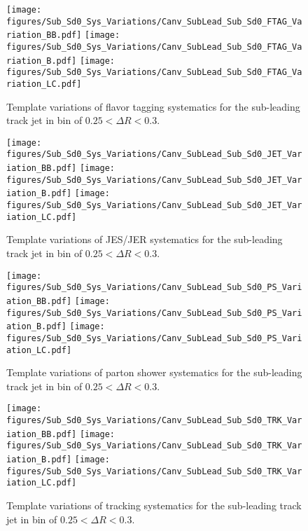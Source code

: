 \begin{figure}[htbp]
  \centering
 \texttt{[image: figures/Sub\_Sd0\_Sys\_Variations/Canv\_SubLead\_Sub\_Sd0\_FTAG\_Variation\_BB.pdf]}
 \texttt{[image: figures/Sub\_Sd0\_Sys\_Variations/Canv\_SubLead\_Sub\_Sd0\_FTAG\_Variation\_B.pdf]}
 \texttt{[image: figures/Sub\_Sd0\_Sys\_Variations/Canv\_SubLead\_Sub\_Sd0\_FTAG\_Variation\_LC.pdf]}
\caption{Template \subsdzero variations of flavor tagging systematics for the sub-leading track jet in bin of $0.25<\Delta R<0.3$. }
  \label{fig:sys-sublead-ftag}
\end{figure}

\begin{figure}[htbp]
  \centering
 \texttt{[image: figures/Sub\_Sd0\_Sys\_Variations/Canv\_SubLead\_Sub\_Sd0\_JET\_Variation\_BB.pdf]}
 \texttt{[image: figures/Sub\_Sd0\_Sys\_Variations/Canv\_SubLead\_Sub\_Sd0\_JET\_Variation\_B.pdf]}
 \texttt{[image: figures/Sub\_Sd0\_Sys\_Variations/Canv\_SubLead\_Sub\_Sd0\_JET\_Variation\_LC.pdf]}
\caption{Template \subsdzero variations of JES/JER systematics for the sub-leading track jet in bin of $0.25<\Delta R<0.3$. }
  \label{fig:sys-sublead-jes-jer}
\end{figure}

\begin{figure}[htbp]
  \centering
 \texttt{[image: figures/Sub\_Sd0\_Sys\_Variations/Canv\_SubLead\_Sub\_Sd0\_PS\_Variation\_BB.pdf]}
 \texttt{[image: figures/Sub\_Sd0\_Sys\_Variations/Canv\_SubLead\_Sub\_Sd0\_PS\_Variation\_B.pdf]}
 \texttt{[image: figures/Sub\_Sd0\_Sys\_Variations/Canv\_SubLead\_Sub\_Sd0\_PS\_Variation\_LC.pdf]}
\caption{Template \subsdzero variations of parton shower systematics for the sub-leading track jet in bin of $0.25<\Delta R<0.3$. }
  \label{fig:sys-sublead-ps}
\end{figure}


\begin{figure}[htbp]
  \centering
 \texttt{[image: figures/Sub\_Sd0\_Sys\_Variations/Canv\_SubLead\_Sub\_Sd0\_TRK\_Variation\_BB.pdf]}
 \texttt{[image: figures/Sub\_Sd0\_Sys\_Variations/Canv\_SubLead\_Sub\_Sd0\_TRK\_Variation\_B.pdf]}
 \texttt{[image: figures/Sub\_Sd0\_Sys\_Variations/Canv\_SubLead\_Sub\_Sd0\_TRK\_Variation\_LC.pdf]}
\caption{Template \subsdzero variations of tracking systematics for the sub-leading track jet in bin of $0.25<\Delta R<0.3$. }
  \label{fig:sys-sublead-trk}
\end{figure}


